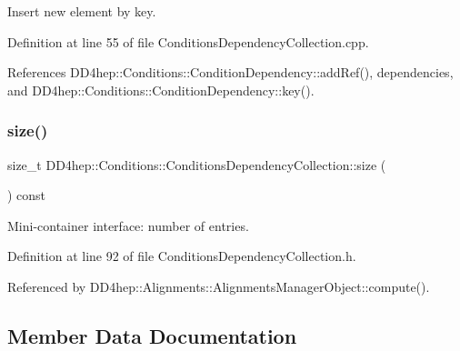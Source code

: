 Insert new element by key. 



Definition at line 55 of file Conditions\+Dependency\+Collection.\+cpp.



References D\+D4hep\+::\+Conditions\+::\+Condition\+Dependency\+::add\+Ref(), dependencies, and D\+D4hep\+::\+Conditions\+::\+Condition\+Dependency\+::key().

\hypertarget{class_d_d4hep_1_1_conditions_1_1_conditions_dependency_collection_a5a5f4e4508993890f83e60f8fe44d93c}{}\label{class_d_d4hep_1_1_conditions_1_1_conditions_dependency_collection_a5a5f4e4508993890f83e60f8fe44d93c} 
\subsubsection{\texorpdfstring{size()}{size()}}
{\footnotesize\ttfamily size\+\_\+t D\+D4hep\+::\+Conditions\+::\+Conditions\+Dependency\+Collection\+::size (\begin{DoxyParamCaption}{ }\end{DoxyParamCaption}) const\hspace{0.3cm}{\ttfamily [inline]}}



Mini-\/container interface\+: number of entries. 



Definition at line 92 of file Conditions\+Dependency\+Collection.\+h.



Referenced by D\+D4hep\+::\+Alignments\+::\+Alignments\+Manager\+Object\+::compute().



\subsection{Member Data Documentation}
\hypertarget{class_d_d4hep_1_1_conditions_1_1_conditions_dependency_collection_aec9ef437ecf9857dbbda3f494be276b9}{}\label{class_d_d4hep_1_1_conditions_1_1_conditions_dependency_collection_aec9ef437ecf9857dbbda3f494be276b9} 
